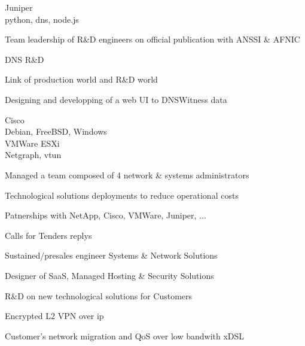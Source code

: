 \documentclass[a4paper,11pt]{cv4tw}%
\begin{document}
	{Juniper\\python, dns, node.js}
		{
		\begin{missions}
			\item Team leadership of R\&D engineers on official publication with ANSSI \& AFNIC
			\item DNS R\&D
			\item Link of production world and R\&D world
			\item Designing and developping of a web UI to DNSWitness data
		\end{missions}
	}


	{Cisco\\Debian, FreeBSD, Windows\\VMWare ESXi\\Netgraph, vtun}
		{
		\begin{missions}
			\item Managed a team composed of 4 network \& systems administrators
			\item Technological solutions deployments to reduce operational costs
			\item Patnerships with NetApp, Cisco, VMWare, Juniper, ...
			\item Calls for Tenders replys
			\item Sustained/presales engineer Systems \& Network Solutions
			\item Designer of SaaS, Managed Hosting \& Security Solutions
			\item R\&D on new technological solutions for Customers
			\item Encrypted L2 VPN over ip
			\item Customer's network migration and QoS over low bandwith xDSL
		\end{missions}
	}
\end{document}
